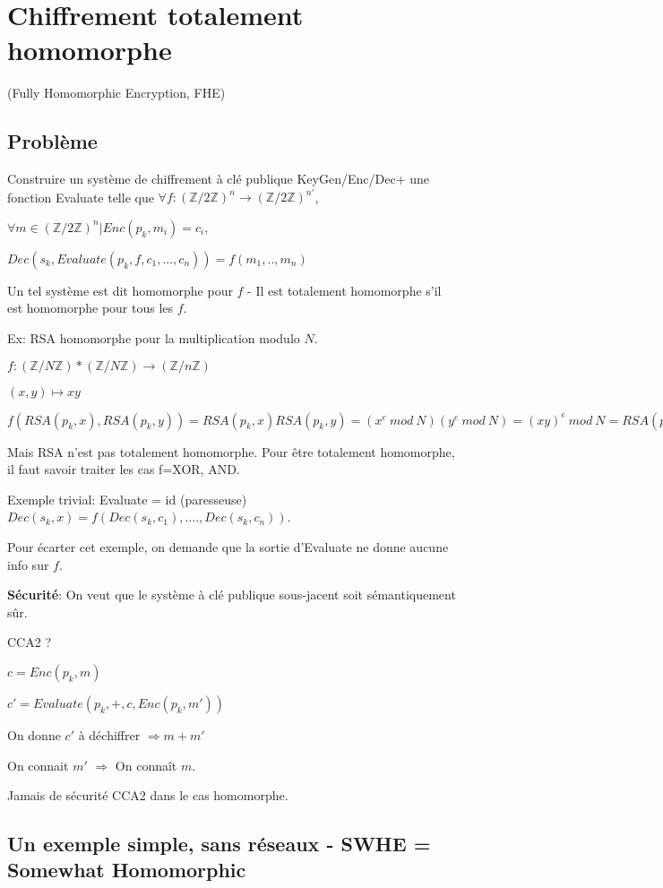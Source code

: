 \section{Chiffrement totalement homomorphe} (Fully Homomorphic Encryption, FHE)

\subsection{Problème}

Construire un système de chiffrement à clé publique KeyGen/Enc/Dec+ une fonction Evaluate telle que 
$\forall f: (\mathbb{Z}/ 2 \mathbb{Z})^n \rightarrow (\mathbb{Z}/ 2 \mathbb{Z})^{n'}$,

$\forall m \in (\mathbb{Z}/ 2 \mathbb{Z})^n | Enc(p_k,m_i)=c_i$,

$Dec(s_k, Evaluate(p_k,f,c_1,...,c_n))=f(m_1,..,m_n)$

Un tel système est dit homomorphe pour $f$ - Il est totalement homomorphe s'il est homomorphe pour tous les $f$.

Ex: RSA homomorphe pour la multiplication modulo $N$.

$f : (\mathbb{Z}/ N \mathbb{Z})*(\mathbb{Z}/ N \mathbb{Z}) \rightarrow (\mathbb{Z}/ n \mathbb{Z})$

$(x,y) \mapsto x y$

$f(RSA(p_k,x),RSA(p_k,y))=RSA(p_k,x) RSA(p_k,y)=(x^e \ mod \ N)(y^e \ mod \ N)=(x y)^e \ mod \ N=RSA(p_k,x y)$

Mais RSA n'est pas totalement homomorphe. Pour être totalement homomorphe, il faut savoir traiter les cas f=XOR, AND.

Exemple trivial: Evaluate = id (paresseuse)
$Dec(s_k,x)=f(Dec(s_k,c_1),....,Dec(s_k,c_n))$.

Pour écarter cet exemple, on demande que la sortie d'Evaluate ne donne aucune info sur $f$.

\textbf{Sécurité}: On veut que le système à clé publique sous-jacent soit sémantiquement sûr.

CCA2 ?

$c=Enc(p_k,m)$

$c'=Evaluate(p_k,+,c,Enc(p_k,m'))$

On donne $c'$ à déchiffrer $\Rightarrow m + m'$

On connait $m'$ $\Rightarrow$ On connaît $m$.

Jamais de sécurité CCA2 dans le cas homomorphe.

\subsection{Un exemple simple, sans réseaux - SWHE = Somewhat Homomorphic}


